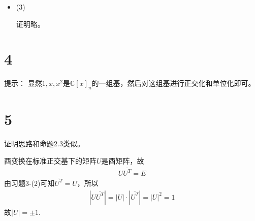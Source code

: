 \documentclass{article}
\begin{document}
\begin{itemize}
        对任意$\alpha = (\epsilon_1, \epsilon_2, \cdots, \epsilon_n) X, \beta = (\epsilon_1, \epsilon_2, \cdots, \epsilon_n) Y$，
        利用本题（3），我们有
        \begin{align*}
          (\alpha, \beta) & = X^T G \overline{Y}
        \end{align*}
        因为
        \begin{align*}
          (\alpha, \beta) = \overline{(\beta, \alpha)}
        \end{align*}
        故
        \begin{align*}
          X^T G \overline{Y}
           & = \overline{Y^T G \overline{X}} \\
           & = \overline{Y^T} \overline{G} X
        \end{align*}
        因为$(\alpha, \beta)$是标量，所以转置不影响取值，故
        \begin{align*}
          \overline{Y^T} \overline{G} X
           & = (\overline{Y^T} \overline{G} X)^T \\
           & = X^T \overline{G}^T \overline{Y}
        \end{align*}
        于是可得
        \begin{align*}
          X^T G \overline{Y} & = X^T \overline{G}^T \overline{Y}
        \end{align*}
        所以
        \begin{align*}
          G = \overline{G}^T
        \end{align*}

  \item (3)

        证明略。
\end{itemize}

\section*{4}

提示：
显然$1, x, x^2$是$\mathbb{C}[x]_n$的一组基，然后对这组基进行正交化和单位化即可。

\section*{5}

证明思路和命题2.3类似。

酉变换在标准正交基下的矩阵$U$是酉矩阵，故
\begin{align*}
  U \overline{U^T} = E
\end{align*}
由习题3-(2)可知$\overline{U^T} = U$，所以
\begin{align*}
  |U \overline{U^T}| = |U| \cdot |\overline{U^T}| = |U|^2 = 1
\end{align*}
故$|U| = \pm 1$.
\end{document}
